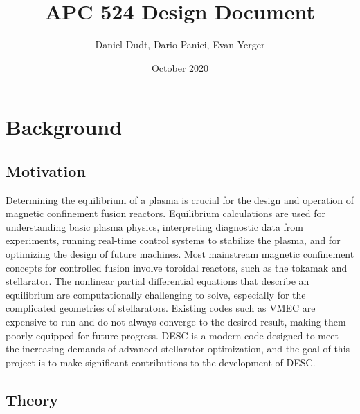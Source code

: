 \documentclass{article}
\title{APC 524 Design Document}
\author{Daniel Dudt, Dario Panici, Evan Yerger}
\date{October 2020}
\begin{document}
\maketitle

\section{Background} %

\subsection{Motivation}

Determining the equilibrium of a plasma is crucial for the design and operation of magnetic confinement fusion reactors.
Equilibrium calculations are used for understanding basic plasma physics, interpreting diagnostic data from experiments, running real-time control systems to stabilize the plasma, and for optimizing the design of future machines.
Most mainstream magnetic confinement concepts for controlled fusion involve toroidal reactors, such as the tokamak and stellarator.
The nonlinear partial differential equations that describe an equilibrium are computationally challenging to solve, especially for the complicated geometries of stellarators.
Existing codes such as VMEC \cite{Hirshman1983} are expensive to run and do not always converge to the desired result, making them poorly equipped for future progress.
DESC \cite{Dudt2020} is a modern code designed to meet the increasing demands of advanced stellarator optimization, and the goal of this project is to make significant contributions to the development of DESC.

\subsection{Theory}
\end{document}
